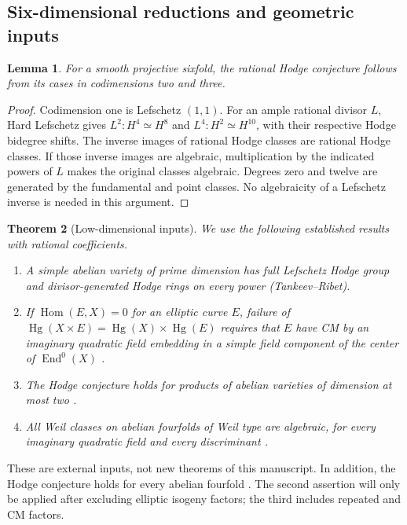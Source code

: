 \documentclass[10pt,reqno]{article}
\theoremstyle{emphasizedplain}
\theoremstyle{emphasizeddefinition}
\theoremstyle{emphasizeddefinition}
\newtheorem{prelemma}{Lemma}
\newtheorem{pretheorem}[prelemma]{Theorem}
\DeclareMathOperator{\End}{End}
\DeclareMathOperator{\Hom}{Hom}
\DeclareMathOperator{\Hg}{Hg}
\begin{document}
\subsection*{Six-dimensional reductions and geometric inputs}
\begin{prelemma}\label{p:HLsix}
For a smooth projective sixfold, the rational Hodge conjecture follows
from its cases in codimensions two and three.
\end{prelemma}
\begin{proof}
Codimension one is Lefschetz $(1,1)$. For an ample rational divisor $L$,
Hard Lefschetz gives $L^2:H^4\simeq H^8$ and $L^4:H^2\simeq H^{10}$,
with their respective Hodge bidegree shifts. The inverse images of rational
Hodge classes are rational Hodge classes. If those inverse images are
algebraic, multiplication by the indicated powers of $L$ makes the
original classes algebraic. Degrees zero and twelve are generated by the
fundamental and point classes. No algebraicity of a Lefschetz inverse is
needed in this argument.
\end{proof}
\begin{pretheorem}[Low-dimensional inputs]\label{p:lowdim}
We use the following established results with rational coefficients.
\begin{enumerate}
\item A simple abelian variety of prime dimension has full Lefschetz
Hodge group and divisor-generated Hodge rings on every power
\cite[Theorem (2.7)]{MZ} (Tankeev--Ribet).
\item If $\Hom(E,X)=0$ for an elliptic curve $E$, failure of
$\Hg(X\times E)=\Hg(X)\times\Hg(E)$ requires that $E$ have CM by an
imaginary quadratic field embedding in a simple field component of
the center of $\End^0(X)$
\cite[Proposition (3.8)]{MZ}.
\item The Hodge conjecture holds for products of abelian varieties of
dimension at most two \cite[Proposition 2.18 in the preprint]{RamonMari}.
\item All Weil classes on abelian fourfolds of Weil type are algebraic,
for every imaginary quadratic field and every discriminant
\cite[proof of Corollary 1.6.1]{Markman}.
\end{enumerate}
\end{pretheorem}
These are external inputs, not new theorems of this manuscript.
In addition, the Hodge conjecture holds for every abelian fourfold
\cite[Corollary 1.6.1]{Markman}.
The second assertion will only be applied after excluding elliptic
isogeny factors; the third includes repeated and CM factors.
\end{document}

